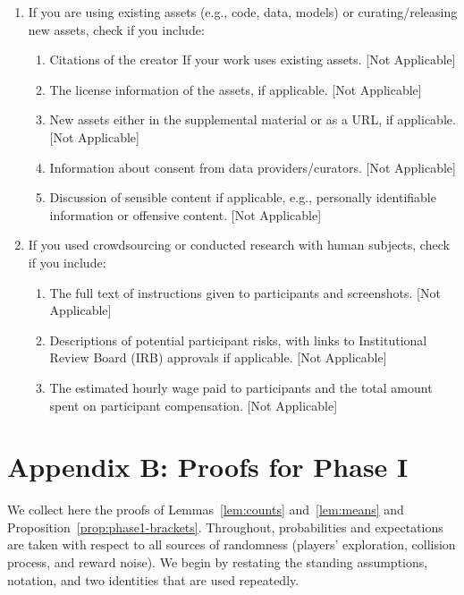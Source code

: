 \begin{enumerate}
  \item If you are using existing assets (e.g., code, data, models) or curating/releasing new assets, check if you include:
  \begin{enumerate}
    \item Citations of the creator If your work uses existing assets. [Not Applicable]
    \item The license information of the assets, if applicable. [Not Applicable]
    \item New assets either in the supplemental material or as a URL, if applicable. [Not Applicable]
    \item Information about consent from data providers/curators. [Not Applicable]
    \item Discussion of sensible content if applicable, e.g., personally identifiable information or offensive content. [Not Applicable]
  \end{enumerate}

  \item If you used crowdsourcing or conducted research with human subjects, check if you include:
  \begin{enumerate}
    \item The full text of instructions given to participants and screenshots. [Not Applicable]
    \item Descriptions of potential participant risks, with links to Institutional Review Board (IRB) approvals if applicable. [Not Applicable]
    \item The estimated hourly wage paid to participants and the total amount spent on participant compensation. [Not Applicable]
  \end{enumerate}

\end{enumerate}

\clearpage
\appendix
\thispagestyle{empty}
\onecolumn
{}







\section*{Appendix B: Proofs for Phase I}
\label{app:phase1}

We collect here the proofs of Lemmas~\ref{lem:counts} and~\ref{lem:means} and Proposition~\ref{prop:phase1-brackets}. Throughout, probabilities and expectations are taken with respect to all sources of randomness (players' exploration, collision process, and reward noise). We begin by restating the standing assumptions, notation, and two identities that are used repeatedly.

